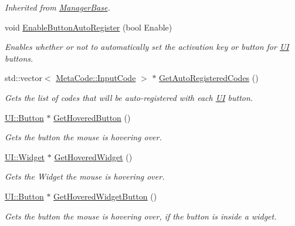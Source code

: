 \begin{DoxyCompactItemize}
\begin{DoxyCompactList}\small\item\em Inherited from \hyperlink{classMezzanine_1_1ManagerBase}{ManagerBase}. \item\end{DoxyCompactList}\item 
void \hyperlink{classMezzanine_1_1UIManager_a5dda002532786846f076ed9c685af2f5}{EnableButtonAutoRegister} (bool Enable)
\begin{DoxyCompactList}\small\item\em Enables whether or not to automatically set the activation key or button for \hyperlink{namespaceMezzanine_1_1UI}{UI} buttons. \item\end{DoxyCompactList}\item 
std::vector$<$ \hyperlink{classMezzanine_1_1MetaCode_a3b5633f0145bf3287cf53a3f05b5563c}{MetaCode::InputCode} $>$ $\ast$ \hyperlink{classMezzanine_1_1UIManager_ab8e71134409a4375236f866774d61fcf}{GetAutoRegisteredCodes} ()
\begin{DoxyCompactList}\small\item\em Gets the list of codes that will be auto-\/registered with each \hyperlink{namespaceMezzanine_1_1UI}{UI} button. \item\end{DoxyCompactList}\item 
\hyperlink{classMezzanine_1_1UI_1_1Button}{UI::Button} $\ast$ \hyperlink{classMezzanine_1_1UIManager_a2430f2ea7e8ca90f320c9205a871fda3}{GetHoveredButton} ()
\begin{DoxyCompactList}\small\item\em Gets the button the mouse is hovering over. \item\end{DoxyCompactList}\item 
\hyperlink{classMezzanine_1_1UI_1_1Widget}{UI::Widget} $\ast$ \hyperlink{classMezzanine_1_1UIManager_ac4a7e054c5a5e52d37f1ff38f5328e9e}{GetHoveredWidget} ()
\begin{DoxyCompactList}\small\item\em Gets the Widget the mouse is hovering over. \item\end{DoxyCompactList}\item 
\hyperlink{classMezzanine_1_1UI_1_1Button}{UI::Button} $\ast$ \hyperlink{classMezzanine_1_1UIManager_a8595c1650244accdff29f7e835bd3043}{GetHoveredWidgetButton} ()
\begin{DoxyCompactList}\small\item\em Gets the button the mouse is hovering over, if the button is inside a widget. \item\end{DoxyCompactList}\item 

\end{DoxyCompactItemize}

